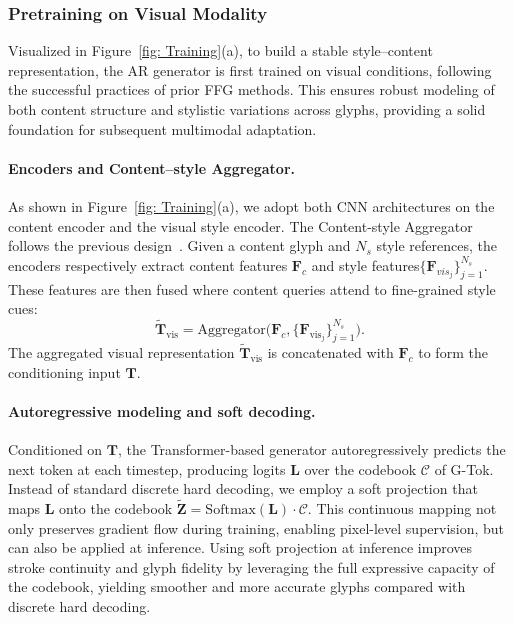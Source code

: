 \subsubsection{Pretraining on Visual Modality}
Visualized in Figure~\ref{fig: Training}(a), to build a stable style–content representation, the AR generator is first trained on visual conditions, following the successful practices of prior FFG methods. This ensures robust modeling of both content structure and stylistic variations across glyphs, providing a solid foundation for subsequent multimodal adaptation.
\vspace{-4mm}
\paragraph{Encoders and Content–style Aggregator.} 
As shown in Figure~\ref{fig: Training}(a), we adopt both CNN architectures on the content encoder and the visual style encoder. The Content-style Aggregator follows the previous design~\cite{Fs_Font, LF_Font}. Given a content glyph and $N_s$ style references, the encoders respectively extract content features $\mathbf{F}_c$ and style features$\{\mathbf{F}_{vis_j}\}^{N_s}_{j=1}$. These features are then fused where content queries attend to fine-grained style cues:
\begin{equation}
\tilde{\mathbf{T}}_{\text{vis}} = \mathrm{Aggregator}\big(\mathbf{F}_c, \{\mathbf{F}_{\text{vis}_j}\}_{j=1}^{N_s}\big).
\end{equation}
The aggregated visual representation $\tilde{\mathbf{T}}_{\text{vis}}$ is concatenated with $\mathbf{F}_c$ to form the conditioning input $\mathbf{T}$.
\vspace{-3mm}
\paragraph{Autoregressive modeling and soft decoding.} Conditioned on $\mathbf{T}$, the Transformer-based generator autoregressively predicts the next token at each timestep, producing logits $\mathbf{L}$ over the codebook $\mathcal{C}$ of G-Tok. Instead of standard discrete hard decoding, we employ a soft projection that maps $\mathbf{L}$ onto the codebook 
$\tilde{\mathbf{Z}} = \mathrm{Softmax}(\mathbf{L}) \cdot \mathcal{C}$.
This continuous mapping not only preserves gradient flow during training, enabling pixel-level supervision, but can also be applied at inference. Using soft projection at inference improves stroke continuity and glyph fidelity by leveraging the full expressive capacity of the codebook, yielding smoother and more accurate glyphs compared with discrete hard decoding.
\vspace{-3mm}
